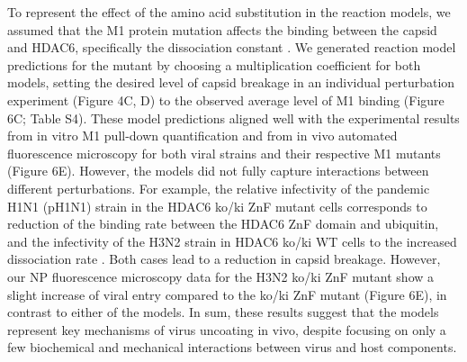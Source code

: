 To represent the effect of the amino acid substitution in the reaction models, we assumed that the M1 protein mutation affects the binding between the capsid and HDAC6, specifically the dissociation constant  . We generated reaction model predictions for the mutant by choosing a multiplication coefficient for both models, setting the desired level of capsid breakage in an individual perturbation experiment (Figure 4C, D) to the observed average level of M1 binding (Figure 6C; Table S4). These model predictions aligned well with the experimental results from in vitro M1 pull-down quantification and from in vivo automated fluorescence microscopy for both viral strains and their respective M1 mutants (Figure 6E). However, the models did not fully capture interactions between different perturbations. For example, the relative infectivity of the pandemic H1N1 (pH1N1) strain in the HDAC6 ko/ki ZnF mutant cells corresponds to reduction of the binding rate  between the HDAC6 ZnF domain and ubiquitin, and the infectivity of the H3N2 strain in HDAC6 ko/ki WT cells to the increased dissociation rate  . Both cases lead to a reduction in capsid breakage. However, our NP fluorescence microscopy data for the H3N2 ko/ki ZnF mutant show a slight increase of viral entry compared to the ko/ki ZnF mutant (Figure 6E), in contrast to either of the models. In sum, these results suggest that the models represent key mechanisms of virus uncoating in vivo, despite focusing on only a few biochemical and mechanical interactions between virus and host components.
